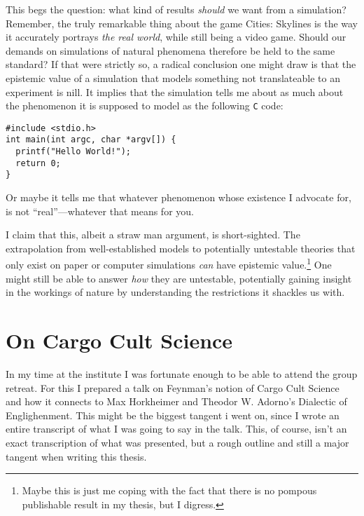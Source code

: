 This begs the question: what kind of results \emph{should} we want from a
simulation? Remember, the truly remarkable thing about the game Cities:
Skylines is the way it accurately portrays \emph{the real world}, while still
being a video game. Should our demands on simulations of natural phenomena
therefore be held to the same standard? If that were strictly so, a radical conclusion
one might draw is that the epistemic value of a simulation that models
something not translateable to an experiment is nill. It implies that
the simulation tells me about as much about the phenomenon it is supposed to
model as the following \texttt{C} code:
\begin{verbatim}
#include <stdio.h>
int main(int argc, char *argv[]) {
  printf("Hello World!");
  return 0;
}
\end{verbatim}
Or maybe it tells me that whatever phenomenon whose existence I advocate for,
is not \enquote{real}---whatever that means for you.

I claim that this, albeit a straw man argument, is short-sighted. The
extrapolation from well-established models to potentially untestable theories
that only exist on paper or computer simulations \emph{can} have epistemic
value.\footnote{Maybe this is just me coping with the fact that there is no
pompous publishable result in my thesis, but I digress.} One might
still be able to answer \emph{how} they are untestable, potentially gaining
insight in the workings of nature by understanding the restrictions it
shackles us with. 

\section*{On Cargo Cult Science}
In my time at the institute I was fortunate enough to be able to attend the
group retreat. For this I prepared a talk on Feynman's notion of Cargo Cult
Science and how it connects to Max Horkheimer and Theodor W. Adorno's Dialectic
of Englighenment. This might be the biggest tangent i went on, since I wrote an
entire transcript of what I was going to say in the talk. This, of course,
isn't an exact transcription of what was presented, but a rough outline and
still a major tangent when writing this thesis.

